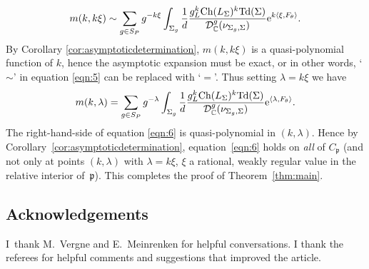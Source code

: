 \documentclass[pdftex]{sigma}
\numberwithin{equation}{section}
\newcommand{\pair}[2]{\langle #1, #2 \rangle}
\def\p{\ensuremath{\mathfrak{p}}}
\def\bC{\ensuremath{\mathbb{C}}}
\def\Ch{\ensuremath{\textnormal{Ch}}}
\def\Td{\ensuremath{\textnormal{Td}}}
\def\calDC{\ensuremath{\mathcal{D}_{\bC}}}
\begin{document}
\begin{gather}\label{eqn:5}
m(k,k\xi)\sim \sum_{g\in S_P} g^{-k\xi} \int_{\Sigma_g} \frac{1}{d}\frac{g_L^k\Ch(L_\Sigma)^k\Td(\Sigma)}{\calDC^g(\nu_{\Sigma_g,\Sigma})}{\rm e}^{k\pair{\xi}{F_\theta}}.
\end{gather}
By Corollary \ref{cor:asymptoticdetermination}, $m(k,k\xi)$ is a quasi-polynomial function of $k$, hence the asymptotic expansion must be exact, or in other words, `$\sim$' in equation \eqref{eqn:5} can be replaced with `$=$'. Thus setting $\lambda=k\xi$ we have
\begin{gather}
\label{eqn:6}
m(k,\lambda)= \sum_{g\in S_P} g^{-\lambda} \int_{\Sigma_g} \frac{1}{d}\frac{g_L^k\Ch(L_\Sigma)^k\Td(\Sigma)}{\calDC^g(\nu_{\Sigma_g,\Sigma})}{\rm e}^{\pair{\lambda}{F_\theta}}.
\end{gather}
The right-hand-side of equation \eqref{eqn:6} is quasi-polynomial in $(k,\lambda)$. Hence by Corollary~\ref{cor:asymptoticdetermination}, equation~\eqref{eqn:6} holds on \emph{all} of $C_\p$ (and not only at points $(k,\lambda)$ with $\lambda=k\xi$, $\xi$ a rational, weakly regular value in the relative interior of~$\p$). This completes the proof of Theorem~\ref{thm:main}.

\subsection*{Acknowledgements}

I~thank M.~Vergne and E.~Meinrenken for helpful conversations. I thank the referees for helpful comments and suggestions that improved the article.
\end{document}
